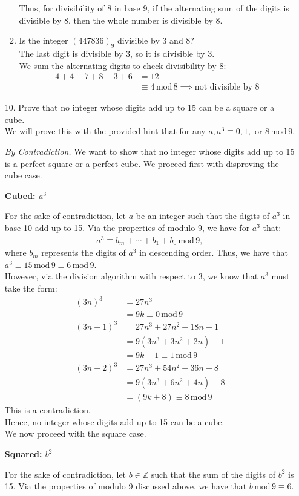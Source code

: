\documentclass[10pt,oneside]{book}
\newcommand{\Z}{\mathbb{Z}}\newcommand{\R}{\mathbb{R}}\newcommand{\N}{\mathbb{N}}
\newcommand{\gspc}{\vspace{0.13cm}} %
\newcommand{\gline}{\gspc\\} %
\newcommand{\gmod}{\,\text{mod}\,}
\newcommand{\centerit}[1]{{\begin{center} #1 \end{center}}}
\let\endoldproof\endproof
\renewenvironment{proof}[1][\proofname]
  {\vspace{0.2cm}\begin{adjustwidth}{2em}{2em}
   \oldproof[#1]}
  {\endoldproof
\end{adjustwidth}}
\begin{document}
\begin{enumerate}
\begin{enumerate}
		Thus, for divisibility of 8 in base 9, if the alternating sum of the digits is divisible by 8, then the whole number is divisible by 8.
		\item Is the integer $(447836)_9$ divisible by 3 and 8? \gline
		The last digit is divisible by 3, so it is divisible by 3.\gline
		We sum the alternating digits to check divisibility by 8:
		\begin{align*}
			4+4-7+8-3+6 &= 12\\
			&\equiv 4 \gmod 8 \implies \text{not divisible by 8}
		\end{align*}
	\end{enumerate}
	\item [10.] Prove that no integer whose digits add up to 15 can be a square or a cube. \gline
	We will prove this with the provided hint that for any $a, a^3\equiv 0, 1, \text{ or }8 \gmod 9$. 
	\begin{proof}
		\textit{By Contradiction.} We want to show that no integer whose digits add up to 15 is a perfect square or a perfect cube. We proceed first with disproving the cube case.
		\centerit{\textbf{Cubed: $a^3$}}
		For the sake of contradiction, let $a$ be an integer such that the digits of $a^3$ in base 10 add up to 15. Via the properties of modulo 9, we have for $a^3$ that:
		\begin{align*}
			a^3 \equiv b_m + \cdots + b_1 + b_0\gmod 9,
		\end{align*}
		where $b_m$ represents the digits of $a^3$ in descending order. Thus, we have that $a^3\equiv 15 \gmod 9 \equiv 6\gmod 9$. \gline
		However, via the division algorithm with respect to 3, we know that $a^3$ must take the form:
		\begin{align*}
			(3n)^3 &= 27n^3\\
			&= \boxed{9k\equiv 0\gmod 9}\\
			(3n+1)^3 &= 27n^3 + 27n^2 + 18n + 1\\
			&= 9(3n^3 + 3n^2 + 2n) + 1\\
			&= \boxed{9k+1\equiv 1\gmod 9}\\
			(3n+2)^3&= 27n^3 + 54n^2 + 36n + 8\\
			&= 9(3n^3 + 6n^2 + 4n) + 8\\
			&= \boxed{(9k+8)\equiv 8\gmod 9}
		\end{align*}
		This is a contradiction.\gline
		Hence, no integer whose digits add up to 15 can be a cube. \gline
		We now proceed with the square case.
		\centerit{\textbf{Squared: $b^2$}}
		For the sake of contradiction, let $b\in\Z$ such that the sum of the digits of $b^2$ is 15. Via the properties of modulo 9 discussed above, we have that $b\gmod 9 \equiv 6$. \gline

\end{proof}
\end{enumerate}
\end{document}
